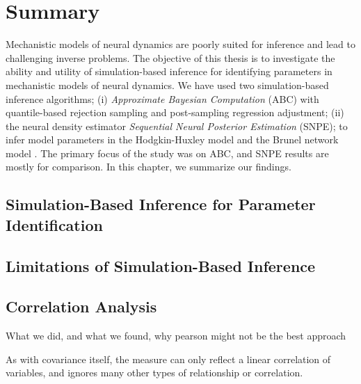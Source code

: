 \chapter{Summary}\label{chap:summary}

Mechanistic models of neural dynamics are poorly suited for inference and lead to challenging inverse problems. The objective of this thesis is to investigate the ability and utility of simulation-based inference for identifying parameters in mechanistic models of neural dynamics. We have used two simulation-based inference algorithms; (i) \textit{Approximate Bayesian Computation} (ABC) with quantile-based rejection sampling and post-sampling regression adjustment; (ii) the neural density estimator \textit{Sequential Neural Posterior Estimation} (SNPE); to infer model parameters in the Hodgkin-Huxley model \cite{HH1952} and the Brunel network model \cite{Brunel2000}. The primary focus of the study was on ABC, and SNPE results are mostly for comparison. In this chapter, we summarize our findings. 

\section{Simulation-Based Inference for Parameter Identification}


\section{Limitations of Simulation-Based Inference}


\section{Correlation Analysis}

What we did, and what we found, why pearson might not be the best approach

As with covariance itself, the measure can only reflect a linear correlation of variables, and ignores many other types of relationship or correlation. 

